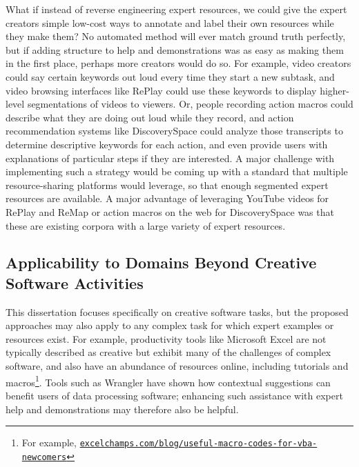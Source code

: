 What if instead of reverse engineering expert resources, we could give the expert creators simple low-cost ways to annotate and label their own resources while they make them? No automated method will ever match ground truth perfectly, but if adding structure to help and demonstrations was as easy as making them in the first place, perhaps more creators would do so. For example, video creators could say certain keywords out loud every time they start a new subtask, and video browsing interfaces like RePlay could use these keywords to display higher-level segmentations of videos to viewers. Or, people recording action macros could describe what they are doing out loud while they record, and action recommendation systems like Discovery\-Space could analyze those transcripts to determine descriptive keywords for each action, and even provide users with explanations of particular steps if they are interested. A major challenge with implementing such a strategy would be coming up with a standard that multiple resource-sharing platforms would leverage, so that enough segmented expert resources are available. A major advantage of leveraging YouTube videos for RePlay and ReMap or action macros on the web for Discovery\-Space was that these are existing corpora with a large variety of expert resources.

\subsection{Applicability to Domains Beyond Creative Software Activities}
This dissertation focuses specifically on creative software tasks, but the proposed approaches may also apply to any complex task for which expert examples or resources exist. For example, productivity tools like Microsoft Excel are not typically described as creative but exhibit many of the challenges of complex software, and also have an abundance of resources online, including tutorials and macros\footnote{For example, \href{https://excelchamps.com/blog/useful-macro-codes-for-vba-newcomers/}{\nolinkurl{excelchamps.com/blog/useful-macro-codes-for-vba-newcomers}}}. Tools such as Wrangler \cite{Kandel2011} have shown how contextual suggestions can benefit users of data processing software; enhancing such assistance with expert help and demonstrations may therefore also be helpful.


